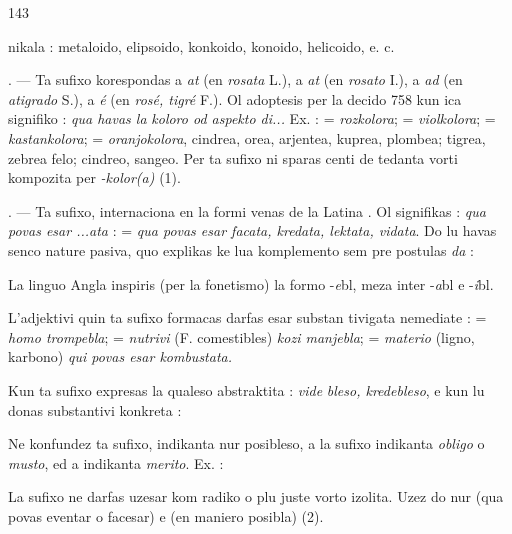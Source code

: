 \begin{VUpage}[147]{143}

\VUcontinue
nikala  : metaloido, elipsoido, konkoido, konoido,\nl
helicoido, e. c.

. --- Ta sufixo korespondas a \textit{at} (en \textit{rosata} L.), a \textit{at} (en\nl
\textit{rosato} I.), a \textit{ad} (en \textit{atigrado} S.), a \textit{é} (en \textit{rosé, tigré} F.). Ol\nl
adoptesis per la decido 758 kun ica signifiko : \textit{qua havas la}\nl
\textit{koloro od aspekto di...} Ex. :  = \textit{rozkolora};  =\nl
\textit{violkolora};  = \textit{kastankolora};  = \textit{oranjokolora},\nl
cindrea, orea, arjentea, kuprea, plombea; tigrea, zebrea felo;\nl
cindreo, sangeo. Per ta sufixo ni sparas centi de tedanta\nl
vorti kompozita per \textit{-kolor(a)} (1).

. --- Ta sufixo, internaciona en la formi \nl
{} venas de la Latina . Ol signifikas :\nl
\textit{qua povas esar ...ata} : \nl
= \textit{qua povas esar facata, kredata, lektata, vidata}. Do lu havas\nl
senco nature pasiva, quo explikas ke lua komplemento sem\cc
pre postulas \textit{da} : 

La linguo Angla inspiris (per la fonetismo) la formo\nl
-\textit{e}bl, meza inter -\textit{a}bl e -\textit{i}bl.

L'adjektivi quin ta sufixo formacas darfas esar substan\cc
tivigata nemediate :  = \textit{homo trompebla}; \nl
= \textit{nutrivi} (F. comestibles) \textit{kozi manjebla};  =\nl
\textit{materio} (ligno, karbono) \textit{qui povas esar kombustata.}

Kun  ta sufixo expresas la qualeso abstraktita : \textit{vide}\cc
\textit{bleso, kredebleso}, e kun  lu donas substantivi konkreta :\nl
{}

Ne konfundez ta sufixo, indikanta nur posibleso, a la\nl
sufixo  indikanta \textit{obligo} o \textit{musto}, ed a  indikanta\nl
\textit{merito}. Ex. : \parplein

La sufixo  ne darfas uzesar kom radiko o plu juste\nl
vorto izolita. Uzez do nur  (qua povas eventar o\nl
facesar) e  (en maniero posibla) (2).
\end{VUpage}

